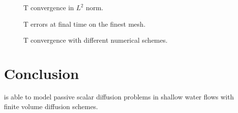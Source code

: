 \begin{figure}[H]
\centering
  \caption{T convergence in $L^2$ norm.}
\label{fig:tracerdiffusion:ErrNumT_convergence}
\end{figure}

\begin{figure}[H]
\centering
  \caption{T errors at final time on the finest mesh.}
\label{fig:tracerdiffusion:ErrNumT_convergence_mesh3}
\end{figure}

\begin{figure}[H]
 \centering
  \caption{T convergence with different numerical schemes.}
 \label{t2d:tracerdiffusion:mesh_convergence_T}
\end{figure}


\section{Conclusion}
 is able to model passive scalar diffusion problems in shallow water
flows with finite volume diffusion schemes.
